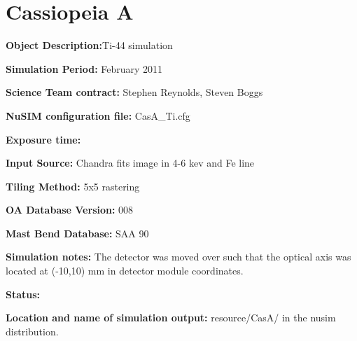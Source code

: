 
\newpage

\section{Cassiopeia A}

\textbf{Object Description:}Ti-44 simulation

\textbf{Simulation Period:} February 2011 %

\textbf{Science Team contract:}  Stephen Reynolds, Steven Boggs

\textbf{NuSIM configuration file:} CasA\_Ti.cfg

\textbf{Exposure time:}

\textbf{Input Source:} Chandra fits image in 4-6 kev and Fe line

\textbf{Tiling Method:} 5x5 rastering

\textbf{OA Database Version:} 008

\textbf{Mast Bend Database:} SAA 90

\textbf{Simulation notes:} The detector was moved over such that the optical axis was located at (-10,10) mm in detector module coordinates.

\textbf{Status:} 

\textbf{Location and name of simulation output:} resource/CasA/  in the nusim distribution.

